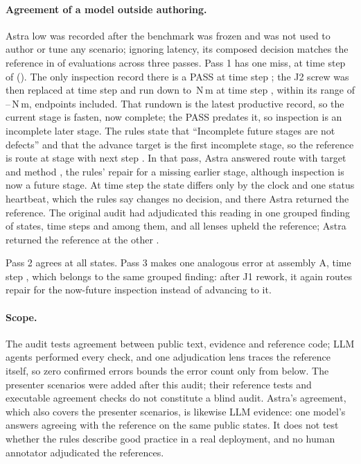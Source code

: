 \paragraph{Agreement of a model outside authoring.}
Astra low was recorded after the benchmark was frozen and was not used to author or tune any scenario; ignoring latency, its composed decision matches the reference in \AstraUntimedStates{} of \AstraStates{} evaluations across three passes.
Pass 1 has one miss, at time step \AstraMissStep{} of \emph{\AstraMissScenarioTitle} (\AstraMissScenarioLabel).
The only inspection record there is a PASS at time step \AstraMissInspectionStep; the J2 screw was then replaced at time step \AstraMissScrewStep{} and run down to \AstraMissRundownNm\,N\,m at time step \AstraMissRundownStep, within its range of \AstraMissTorqueMinNm--\AstraMissTorqueMaxNm\,N\,m, endpoints included.
That rundown is the latest productive record, so the current stage is fasten, now complete; the PASS predates it, so inspection is an incomplete later stage.
The rules state that ``Incomplete future stages are not defects'' and that the advance target is the first incomplete stage, so the reference is route \emph{\AstraMissRefRoute} at stage \emph{\AstraMissRefStage} with next step \emph{\AstraMissRefNextStep}.
In that pass, Astra answered route \emph{\AstraMissRoute} with target \emph{\AstraMissTarget} and method \emph{\AstraMissMethod}, the rules' repair for a missing earlier stage, although inspection is now a future stage.
At time step \AstraMissPrevStep{} the state differs only by the clock and one status heartbeat, which the rules say changes no decision, and there Astra returned the reference.
The original audit had adjudicated this reading in one grouped finding of \AstraSituationStates{} states, time steps \AstraMissPrevStep{} and \AstraMissStep{} among them, and all \AuditLensesWord{} lenses upheld the reference; Astra returned the reference at the other \AstraSituationCorrect.

Pass 2 agrees at all \NumStates{} states. Pass 3 makes one analogous error at assembly A, time step \AstraMissStepPassThree{}, which belongs to the same grouped finding: after J1 rework, it again routes repair for the now-future inspection instead of advancing to it.

\paragraph{Scope.}
The audit tests agreement between public text, evidence and reference code; LLM agents performed every check, and one adjudication lens traces the reference itself, so zero confirmed errors bounds the error count only from below.
The presenter scenarios were added after this audit; their reference tests and executable agreement checks do not constitute a blind audit.
Astra's agreement, which also covers the presenter scenarios, is likewise LLM evidence: one model's answers agreeing with the reference on the same public states.
It does not test whether the rules describe good practice in a real deployment, and no human annotator adjudicated the references.

